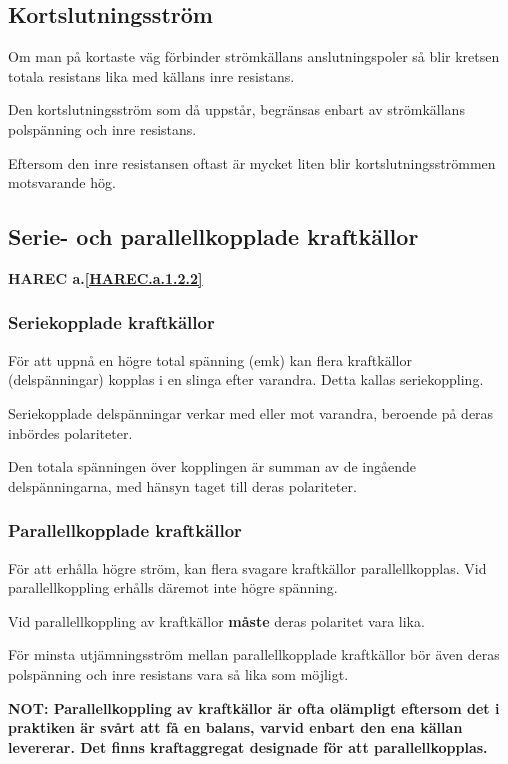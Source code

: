 \subsection{Kortslutningsström}

Om man på kortaste väg förbinder strömkällans anslutningspoler så blir kretsen
totala resistans lika med källans inre resistans.

Den kortslutningsström som då uppstår, begränsas enbart av strömkällans
polspänning och inre resistans.

Eftersom den inre resistansen oftast är mycket liten blir kortslutningsströmmen
motsvarande hög.

\subsection{Serie- och parallellkopplade kraftkällor}
\textbf{HAREC a.\ref{HAREC.a.1.2.2}\label{myHAREC.a.1.2.2}}

\subsubsection{Seriekopplade kraftkällor}

För att uppnå en högre total spänning (emk) kan flera kraftkällor
(delspänningar) kopplas i en slinga efter varandra. Detta kallas seriekoppling.

Seriekopplade delspänningar verkar med eller mot varandra, beroende på
deras inbördes polariteter.

Den totala spänningen över kopplingen är summan av de ingående
delspänningarna, med hänsyn taget till deras polariteter.

\subsubsection{Parallellkopplade kraftkällor}

För att erhålla högre ström, kan flera svagare kraftkällor parallellkopplas.
Vid parallellkoppling erhålls däremot inte högre spänning.

Vid parallellkoppling av kraftkällor \textbf{måste} deras polaritet vara lika.

För minsta utjämningsström mellan parallellkopplade kraftkällor bör även deras
polspänning och inre resistans vara så lika som möjligt.

\textbf{NOT: Parallellkoppling av kraftkällor är ofta olämpligt eftersom det
i praktiken är svårt att få en balans, varvid enbart den ena källan levererar.
Det finns kraftaggregat designade för att parallellkopplas.}
